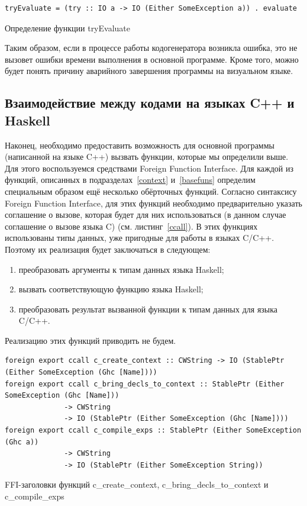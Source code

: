 \begin{ListingEnv}[h]
	\begin{lstlisting}
tryEvaluate = (try :: IO a -> IO (Either SomeException a)) . evaluate
	\end{lstlisting}
	\caption{Определение функции tryEvaluate}\label{tryeval}
\end{ListingEnv}
	
	Таким образом, если в процессе работы кодогенератора возникла ошибка, это не вызовет ошибки времени выполнения в основной программе. Кроме того, можно будет понять причину аварийного завершения программы на визуальном языке.
	
	\subsection{Взаимодействие между кодами на языках C++ и Haskell}	
	Наконец, необходимо предоставить возможность для основной программы (написанной на языке C++) вызвать функции, которые мы определили выше. Для этого воспользуемся средствами Foreign Function Interface. Для каждой из функций, описанных в подразделах~\ref{context} и~\ref{basefuns} определим специальным образом ещё несколько обёрточных функций. Согласно синтаксису Foreign Function Interface, для этих функций необходимо предварительно указать соглашение о вызове, которая будет для них использоваться (в данном случае соглашение о вызове языка C) (см. листинг~\ref{ccall}). В этих функциях использованы типы данных, уже пригодные для работы в языках C/C++. Поэтому их реализация будет заключаться в следующем:
	\begin{enumerate}[1)]
		\item преобразовать аргументы к типам данных языка Haskell;
		\item вызвать соответствующую функцию языка Haskell;
		\item преобразовать результат вызванной функции к типам данных для языка C/C++.
	\end{enumerate}

	Реализацию этих функций приводить не будем.

\begin{ListingEnv}
	\begin{lstlisting}
foreign export ccall c_create_context :: CWString -> IO (StablePtr (Either SomeException (Ghc [Name])))
foreign export ccall c_bring_decls_to_context :: StablePtr (Either SomeException (Ghc [Name])) 
              -> CWString 
              -> IO (StablePtr (Either SomeException (Ghc [Name])))
foreign export ccall c_compile_exps :: StablePtr (Either SomeException (Ghc a)) 
              -> CWString 
              -> IO (StablePtr (Either SomeException String))
	\end{lstlisting}
	\caption{FFI-заголовки функций c\_create\_context, c\_bring\_decls\_to\_context и c\_compile\_exps}\label{ccall}
\end{ListingEnv}	
	
